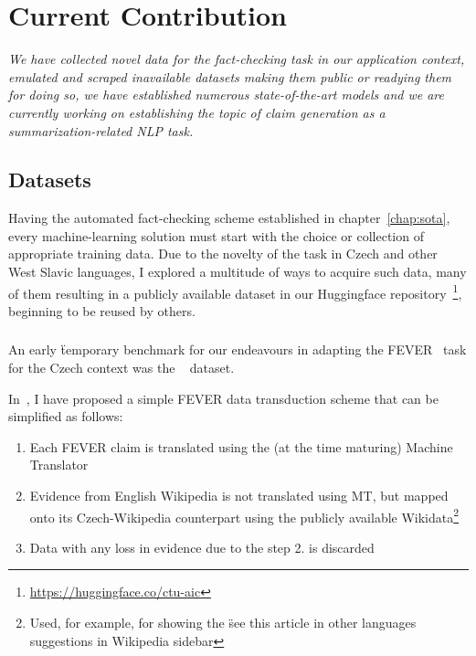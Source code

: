 
\chapter{Current Contribution}
\label{chap:contribution}

\textit{We have collected novel data for the fact-checking task in our application context, emulated and scraped inavailable datasets making them public or readying them for doing so, we have established numerous state-of-the-art models and we are currently working on establishing the topic of claim generation as a summarization-related NLP task.}

\section{Datasets}
Having the automated fact-checking scheme established in chapter~\ref{chap:sota}, every machine-learning solution must start with the choice or collection of appropriate training data.
Due to the novelty of the task in Czech and other West Slavic languages, I explored a multitude of ways to acquire such data, many of them resulting in a publicly available dataset in our Huggingface repository~\footnote{\url{https://huggingface.co/ctu-aic}}, beginning to be reused by others. 

\subsection{\FCZ}\label{sec:fcz}
An early \"{temporary benchmark} for our endeavours in adapting the FEVER~\cite{fever} task for the Czech context was the \FCZ~\cite{lrev} dataset.

In~\cite{diplomka}, I have proposed a simple FEVER data transduction scheme that can be simplified as follows:

\begin{enumerate}
    \item Each FEVER claim is translated using the (at the time maturing) Machine Translator
    \item Evidence from English Wikipedia is not translated using MT, but mapped onto its Czech-Wikipedia counterpart using the publicly available Wikidata\footnote{Used, for example, for showing the \"{see this article in other languages} suggestions in Wikipedia sidebar}
    \item Data with any loss in evidence due to the step 2. is discarded
\end{enumerate}

